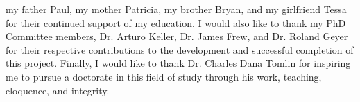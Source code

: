 
 my father Paul, my mother Patricia, my brother Bryan, and my girlfriend Tessa for their continued support of my education. I would also like to thank my PhD Committee members, Dr. Arturo Keller, Dr. James Frew, and Dr. Roland Geyer for their respective contributions to the development and successful completion of this project. Finally, I would like to thank Dr. Charles Dana Tomlin for inspiring me to pursue a doctorate in this field of study through his work, teaching, eloquence, and integrity.